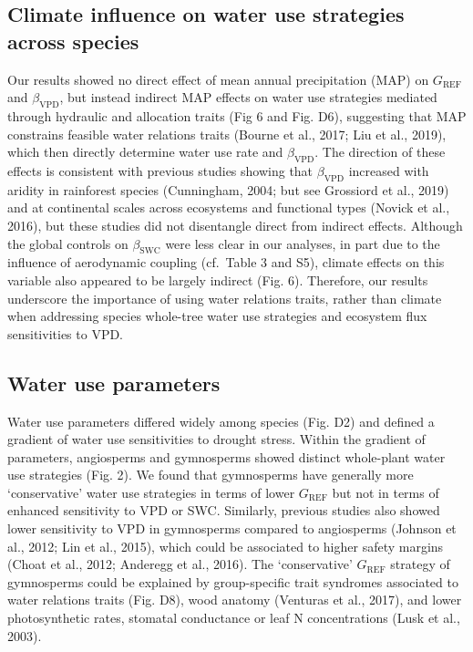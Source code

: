 \documentclass[11pt,twoside]{reedthesis}
\begin{document}
\subsection{Climate influence on water use strategies across
species}\label{climate-influence-on-water-use-strategies-across-species}

Our results showed no direct effect of mean annual precipitation (MAP)
on \(G_{\text{REF}}\) and \(\beta_{\text{VPD}}\), but instead indirect
MAP effects on water use strategies mediated through hydraulic and
allocation traits (Fig 6 and Fig. D6), suggesting that MAP constrains
feasible water relations traits (Bourne et al., 2017; Liu et al., 2019),
which then directly determine water use rate and \(\beta_{\text{VPD}}\).
The direction of these effects is consistent with previous studies
showing that \(\beta_{\text{VPD}}\) increased with aridity in rainforest
species (Cunningham, 2004; but see Grossiord et al., 2019) and at
continental scales across ecosystems and functional types (Novick et
al., 2016), but these studies did not disentangle direct from indirect
effects. Although the global controls on \(\beta_{\text{SWC}}\) were
less clear in our analyses, in part due to the influence of aerodynamic
coupling (cf.~Table 3 and S5), climate effects on this variable also
appeared to be largely indirect (Fig. 6). Therefore, our results
underscore the importance of using water relations traits, rather than
climate when addressing species whole-tree water use strategies and
ecosystem flux sensitivities to VPD.\par

\subsection{Water use parameters}\label{water-use-parameters}

Water use parameters differed widely among species (Fig. D2) and defined
a gradient of water use sensitivities to drought stress. Within the
gradient of parameters, angiosperms and gymnosperms showed distinct
whole-plant water use strategies (Fig. 2). We found that gymnosperms
have generally more `conservative' water use strategies in terms of
lower \(G_{\text{REF}}\) but not in terms of enhanced sensitivity to VPD
or SWC. Similarly, previous studies also showed lower sensitivity to VPD
in gymnosperms compared to angiosperms (Johnson et al., 2012; Lin et
al., 2015), which could be associated to higher safety margins (Choat et
al., 2012; Anderegg et al., 2016). The `conservative' \(G_{\text{REF}}\)
strategy of gymnosperms could be explained by group-specific trait
syndromes associated to water relations traits (Fig. D8), wood anatomy
(Venturas et al., 2017), and lower photosynthetic rates, stomatal
conductance or leaf N concentrations (Lusk et al., 2003).\par
\end{document}
